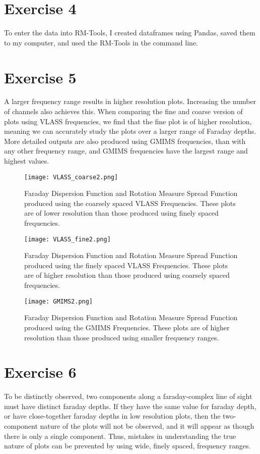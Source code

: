 \documentclass{article}
\begin{document}
\section*{Exercise 4}
To enter the data into RM-Tools, I created dataframes using Pandas, saved them to my computer, and used the RM-Tools in the command line.
\section*{Exercise 5}
A larger frequency range results in higher resolution plots. Increasing the number of channels also achieves this. When comparing the fine and coarse version of plots using VLASS frequencies, we find that the fine plot is of higher resolution, meaning we can accurately study the plots over a larger range of Faraday depths. More detailed outputs are also produced using GMIMS frequencies, than with any other frequency range, and GMIMS frequencies have the largest range and highest values.
\begin{figure}[hbt!]
\centering
\texttt{[image: VLASS\_coarse2.png]}
\label{fig:rel_err}
\caption{Faraday Dispersion Function and Rotation Measure Spread Function produced using the coarsely spaced VLASS Frequencies. These plots are of lower resolution than those produced using finely spaced frequencies.}
\end{figure}

\begin{figure}[hbt!]
\centering
\texttt{[image: VLASS\_fine2.png]}
\label{fig:rel_err}
\caption{Faraday Dispersion Function and Rotation Measure Spread Function produced using the finely spaced VLASS Frequencies. These plots are of higher resolution than those produced using coarsely spaced frequencies.}
\end{figure}

\begin{figure}[hbt!]
\centering
\texttt{[image: GMIMS2.png]}
\label{fig:rel_err}
\caption{Faraday Dispersion Function and Rotation Measure Spread Function produced using the GMIMS Frequencies. These plots are of higher resolution than those produced using smaller frequency ranges.}
\end{figure}

\section*{Exercise 6}
To be distinctly observed, two components along a faraday-complex line of sight must have distinct faraday depths. If they have the same value for faraday depth, or have close-together faraday depths in low resolution plots, then the two-component nature of the plots will not be observed, and it will appear as though there is only a single component. Thus, mistakes in understanding the true nature of plots can be prevented by using wide, finely spaced, frequency ranges.
\end{document}
